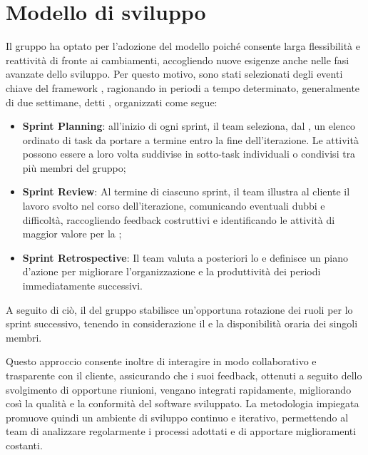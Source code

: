 \section{Modello di sviluppo}
\label{sec:modello_sviluppo}

Il gruppo ha optato per l'adozione del modello  poiché consente larga flessibilità e reattività di fronte ai cambiamenti, accogliendo nuove esigenze anche nelle fasi avanzate dello sviluppo. Per questo motivo, sono stati selezionati degli eventi chiave del framework , ragionando in periodi a tempo determinato, generalmente di due settimane, detti , organizzati come segue:
\begin{itemize}
\item \textbf{Sprint Planning}: all'inizio di ogni sprint, il team seleziona, dal , un elenco ordinato di task da portare a termine entro la fine dell'iterazione. Le attività possono essere a loro volta suddivise in sotto-task individuali o condivisi tra più membri del gruppo;
\item \textbf{Sprint Review}: Al termine di ciascuno sprint, il team illustra al cliente il lavoro svolto nel corso dell'iterazione, comunicando eventuali dubbi e difficoltà, raccogliendo feedback costruttivi e identificando le attività di maggior valore per la ;
\item \textbf{Sprint Retrospective}: Il team valuta a posteriori lo  e definisce un piano d'azione per migliorare l'organizzazione e la produttività dei periodi immediatamente successivi.
\end{itemize}
A seguito di ciò, il \Responsabile{} del gruppo stabilisce un'opportuna rotazione dei ruoli per lo sprint successivo, tenendo in considerazione il  e la disponibilità oraria dei singoli membri.

Questo approccio consente inoltre di interagire in modo collaborativo e trasparente con il cliente, assicurando che i suoi feedback, ottenuti a seguito dello svolgimento di opportune riunioni, vengano integrati rapidamente, migliorando così la qualità e la conformità del software sviluppato.
La metodologia impiegata promuove quindi un ambiente di sviluppo continuo e iterativo, permettendo al team di analizzare regolarmente i processi adottati e di apportare miglioramenti costanti.
